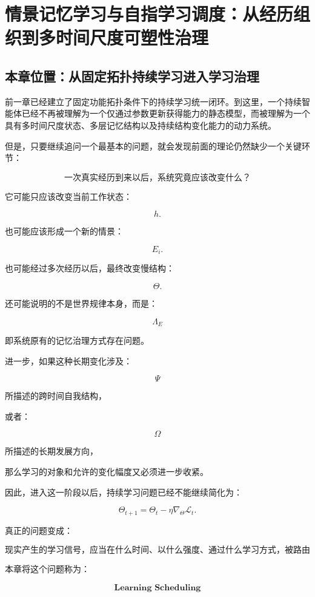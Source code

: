 \chapter{情景记忆学习与自指学习调度：从经历组织到多时间尺度可塑性治理}

\section{本章位置：从固定拓扑持续学习进入学习治理}

前一章已经建立了固定功能拓扑条件下的持续学习统一闭环。到这里，一个持续智能体已经不再被理解为一个仅通过参数更新获得能力的静态模型，而被理解为一个具有多时间尺度状态、多层记忆结构以及持续结构变化能力的动力系统。

但是，只要继续追问一个最基本的问题，就会发现前面的理论仍然缺少一个关键环节：

\[
\boxed{
\text{一次真实经历到来以后，系统究竟应该改变什么？}
}
\]

它可能只应该改变当前工作状态：

\[
h.
\]

也可能应该形成一个新的情景：

\[
E_i.
\]

也可能经过多次经历以后，最终改变慢结构：

\[
\Theta.
\]

还可能说明的不是世界规律本身，而是：

\[
\Lambda_E
\]

即系统原有的记忆治理方式存在问题。

进一步，如果这种长期变化涉及：

\[
\Psi
\]

所描述的跨时间自我结构，

或者：

\[
\Omega
\]

所描述的长期发展方向，

那么学习的对象和允许的变化幅度又必须进一步收紧。

因此，进入这一阶段以后，持续学习问题已经不能继续简化为：

\[
\Theta_{t+1}
=
\Theta_t-\eta\nabla_{\Theta}\mathcal L_t.
\]

真正的问题变成：

\[
\boxed{
\textbf{
现实产生的学习信号，应当在什么时间、以什么强度、通过什么学习方式，被路由到智能体的哪一种结构。
}
}
\]

本章将这个问题称为：

\[
\boxed{
\textbf{Learning Scheduling}
}
\]

